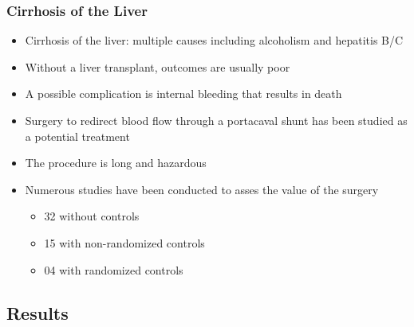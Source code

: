 \documentclass[t,xcolor=pst,dvips]{beamer}
\begin{document}
\begin{frame}[t]\frametitle{Cirrhosis of the Liver}
{\small
\begin{itemize}
\item Cirrhosis of the liver:  multiple causes including alcoholism and hepatitis B/C
\item Without a liver transplant, outcomes are usually poor
\item A possible complication is internal bleeding that results in death
\item Surgery to redirect blood flow through a portacaval shunt has been studied as a potential treatment
\item The procedure is long and hazardous
\item Numerous studies have been conducted to asses the value of the surgery
   \begin{itemize}
      \item 32 without controls
      \item 15 with non-randomized controls
      \item {\color{white}0}4 with randomized controls
   \end{itemize}
\end{itemize}

}
\end{frame}

\subsection{Results}
\end{document}
